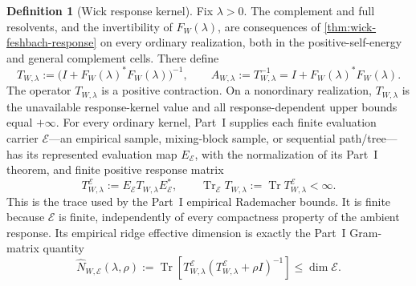 \documentclass[11pt]{article}
\numberwithin{section}{part}
\theoremstyle{plain}
\theoremstyle{definition}
\newtheorem{definition}[definition]{Definition}
\theoremstyle{remark}
\begin{document}
\begin{definition}[Wick response kernel]
\label{def:wick-response-kernel}
Fix \(\lambda>0\).  The complement and full resolvents, and the
invertibility of \(F_W(\lambda)\), are consequences of
\cref{thm:wick-feshbach-response} on every ordinary realization, both in the
positive-self-energy and general complement cells.  There define
\begin{equation}
 \label{eq:wick-response-kernel}
 T_{W,\lambda}
 :=\bigl(I+F_W(\lambda)^*F_W(\lambda)\bigr)^{-1},
 \qquad
 A_{W,\lambda}:=T_{W,\lambda}^{-1}
 =I+F_W(\lambda)^*F_W(\lambda).
\end{equation}
The operator \(T_{W,\lambda}\) is a positive contraction.  On a nonordinary
realization, \(T_{W,\lambda}\) is the unavailable response-kernel value and
all response-dependent upper bounds equal \(+\infty\).  For every ordinary
kernel, Part~I supplies each finite evaluation carrier \(\mathscr E\)---an empirical sample,
mixing-block sample, or sequential path/tree---has its represented evaluation
map \(E_{\mathscr E}\), with the normalization of its Part~I theorem, and
finite positive response matrix
\begin{equation}
 \label{eq:wick-empirical-response-compression}
 T_{W,\lambda}^{\mathscr E}
 :=E_{\mathscr E}T_{W,\lambda}E_{\mathscr E}^*,
 \qquad
 \operatorname{Tr}_{\mathscr E}T_{W,\lambda}
 :=\operatorname{Tr}T_{W,\lambda}^{\mathscr E}<\infty.
\end{equation}
This is the trace used by the Part~I empirical Rademacher bounds.  It is
finite because \(\mathscr E\) is finite, independently of every compactness
property of the ambient response.  Its empirical ridge effective dimension
is exactly the Part~I Gram-matrix quantity
\begin{equation}
 \label{eq:wick-empirical-effective-dimension}
 \widehat N_{W,\mathscr E}(\lambda,\rho)
 :=\operatorname{Tr}\!\left[
 T_{W,\lambda}^{\mathscr E}
 (T_{W,\lambda}^{\mathscr E}+\rho I)^{-1}\right]
 \le \dim\mathscr E.
\end{equation}


\end{definition}
\end{document}
